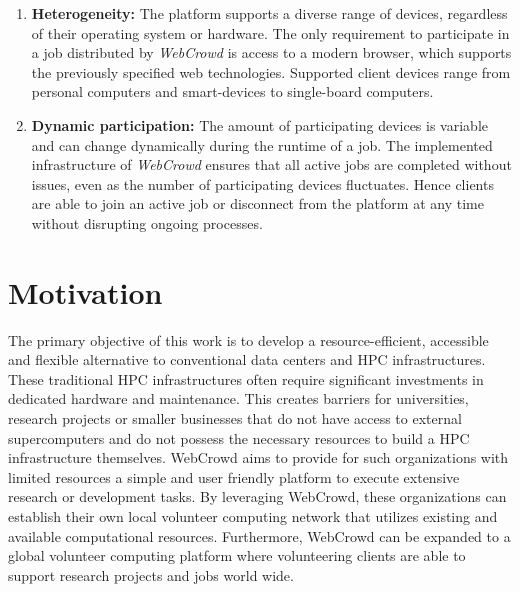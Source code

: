 \begin{enumerate}
    \item \textbf{Heterogeneity:} The platform supports a diverse range of devices, regardless of their operating system or hardware. The only requirement to participate in a job distributed by \emph{WebCrowd} is access to a modern browser, which supports the previously specified web technologies. Supported client devices range from personal computers and smart-devices to single-board computers.
    \item \textbf{Dynamic participation:} The amount of participating devices is variable and can change dynamically during the runtime of a job. The implemented infrastructure of \emph{WebCrowd} ensures that all active jobs are completed without issues, even as the number of participating devices fluctuates. Hence clients are able to join an active job or disconnect from the platform at any time without disrupting ongoing processes.
\end{enumerate}

\section{Motivation}
\label{sec:intro:motivation}
The primary objective of this work is to develop a resource-efficient, accessible and flexible alternative to conventional data centers and \ac{HPC} infrastructures. These traditional \ac{HPC} infrastructures often require significant investments in dedicated hardware and maintenance. This creates barriers for universities, research projects or smaller businesses that do not have access to external supercomputers and do not possess the necessary resources to build a \ac{HPC} infrastructure themselves. WebCrowd aims to provide for such organizations with limited resources a simple and user friendly platform to execute extensive research or development tasks. By leveraging WebCrowd, these organizations can establish their own local volunteer computing network that utilizes existing and available computational resources. Furthermore, WebCrowd can be expanded to a global volunteer computing platform where volunteering clients are able to support research projects and jobs world wide.

